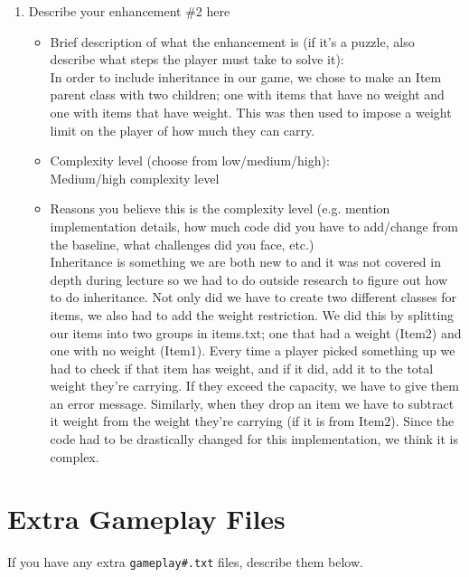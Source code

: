 \documentclass[11pt]{article}
\begin{document}
\begin{enumerate}
\item Describe your enhancement \#2 here
	\begin{itemize}
	\item Brief description of what the enhancement is (if it's a puzzle, also describe what steps the player must take to solve it):
    \\ In order to include inheritance in our game, we chose to make an Item parent class with two children; one with items that have no weight and one with items that have weight. This was then used to impose a weight limit on the player of how much they can carry.
	\item Complexity level (choose from low/medium/high):
    \\ Medium/high complexity level
	\item Reasons you believe this is the complexity level (e.g. mention implementation details, how much code did you have to add/change from the baseline, what challenges did you face, etc.)
	\\ Inheritance is something we are both new to and it was not covered in depth during lecture so we had to do outside research to figure out how to do inheritance. Not only did we have to create two different classes for items, we also had to add the weight restriction. We did this by splitting our items into two groups in items.txt; one that had a weight (Item2) and one with no weight (Item1). Every time a player picked something up we had to check if that item has weight, and if it did, add it to the total weight they're carrying. If they exceed the capacity, we have to give them an error message. Similarly, when they drop an item we have to subtract it weight from the weight they're carrying (if it is from Item2). Since the code had to be drastically changed for this implementation, we think it is complex.
	\end{itemize}

\end{enumerate}


\section*{Extra Gameplay Files}

If you have any extra \texttt{gameplay\#.txt} files, describe them below.
\end{document}
